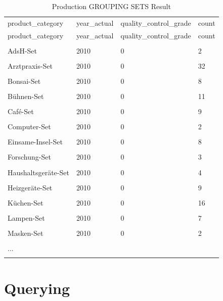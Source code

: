 \documentclass[letterpaper,12pt]{article}
\begin{document}
\begingroup
\renewcommand\arraystretch{0.5}
\begin{longtable}{p{4cm}p{3cm}p{4cm}p{2cm}}
        \caption{Production GROUPING SETS Result} \\
	product\_category & year\_actual & quality\_control\_grade & count
        \endfirsthead \\
        product\_category & year\_actual & quality\_control\_grade & count
        \endhead \\
	\hline \\
        AdsH-Set & 2010 & 0 & 2 \\
        \hline \\
        Arztpraxis-Set & 2010 & 0 & 32 \\
        \hline \\
        Bonsai-Set & 2010 & 0 & 8 \\
        \hline \\
        Bühnen-Set & 2010 & 0 & 11 \\
        \hline \\
        Café-Set & 2010 & 0 & 9 \\
        \hline \\
        Computer-Set & 2010 & 0 & 2 \\
        \hline \\
        Einsame-Insel-Set & 2010 & 0 & 8 \\
        \hline \\
        Forschung-Set & 2010 & 0 & 3 \\
        \hline \\
        Haushaltsgeräte-Set & 2010 & 0 & 4 \\
        \hline \\
        Heizgeräte-Set & 2010 & 0 & 9 \\
        \hline \\
        Küchen-Set & 2010 & 0 & 16 \\
        \hline \\
        Lampen-Set & 2010 & 0 & 7 \\
        \hline \\
        Masken-Set & 2010 & 0 & 2 \\
        \hline \\				
        ... & & & \\
        \hline \\
\end{longtable} 
\endgroup  

\section{Querying}
\end{document}
